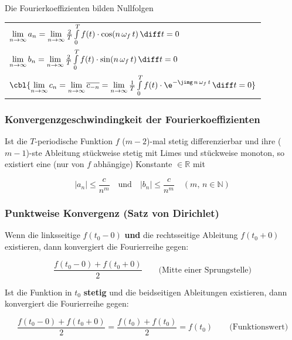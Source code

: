 Die Fourierkoeffizienten bilden Nullfolgen 

\renewcommand{\arraystretch}{2}
\begin{tabular}{l}
    $\lim \limits_{n \to \infty} a_n = \lim \limits_{n \to \infty} \frac{2}{T} \int \limits_0^T f(t) \cdot \cos(n\, \omega_f \, t) \, \diff t = 0$                                                                  \\
    $\lim \limits_{n \to \infty} b_n = \lim \limits_{n \to \infty} \frac{2}{T} \int \limits_0^T f(t) \cdot \sin(n\, \omega_f \, t) \, \diff t = 0$                                                                  \\
    $\cbl{\lim \limits_{n \to \infty} c_n = \lim \limits_{n \to \infty} \overline{c_{-n}} = \lim \limits_{n \to\infty} \frac{1}{T} \int \limits_0^T f(t) \cdot  \e^{- \jimg \, n \, \omega_f \, t} \, \diff t = 0}$
\end{tabular}
\renewcommand{\arraystretch}{1}


\subsubsection{Konvergenzgeschwindingkeit der Fourierkoeffizienten}

Ist die $T$-periodische Funktion $f$ ($m-2$)-mal stetig differenzierbar und ihre ($m-1$)-ste Ableitung stückweise stetig mit Limes und 
stückweise monoton, so existiert eine (nur von $f$ abhängige) Konstante $\in \mathbb{R}$ mit

$$ \vert a_n \vert \leq \frac{c}{n^m} \quad \text{und} \quad \vert b_n \vert \leq \frac{c}{n^m} \quad (m, \, n \in \mathbb{N}) $$


\subsubsection{Punktweise Konvergenz (Satz von Dirichlet)}

Wenn die linksseitige $f(t_0 - 0)$ \textbf{und} die rechtsseitige Ableitung $f(t_0 + 0)$ existieren, dann konvergiert die Fourierreihe gegen:	

$$ \frac{f(t_0 - 0) + f(t_0 + 0)}{2} \qquad \text{(Mitte einer Sprungstelle)} $$


Ist die Funktion in $t_0$ \textbf{stetig} und die beidseitigen Ableitungen existieren, dann konvergiert die Fourierreihe gegen:	

$$ \frac{f(t_0 - 0) + f(t_0 + 0)}{2} = \frac{f(t_0) + f(t_0)}{2} = f(t_0) \qquad \text{(Funktionswert)} $$

